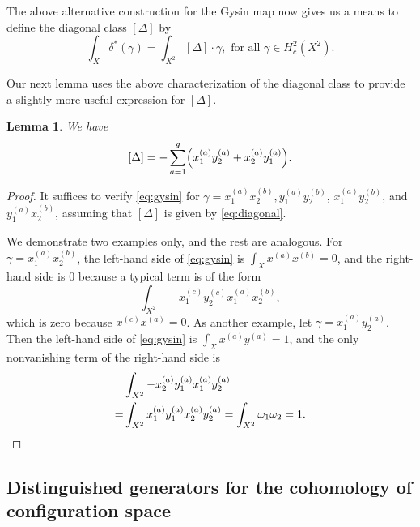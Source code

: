 \documentclass[11pt,reqno]{amsproc}
\numberwithin{equation}{section}
\newtheorem{lemma}[theorem]{Lemma}
\theoremstyle{definition}
\theoremstyle{remark}
\DeclarePairedDelimiter{\parens}{\lparen}{\rparen}
\newcommand{\spp}[1]{^{(#1)}}
\begin{document}
The above alternative construction for the Gysin map now gives us a means to define the diagonal class $[\Delta]$ by
\begin{equation}\label{eq:gysin}
\int_X \delta^*(\gamma) = \int_{X^2} [\Delta]\cdot \gamma, \text{ for all }\gamma\in H^2_c(X^2).
\end{equation}

Our next lemma uses the above characterization of the diagonal class to provide a slightly more useful expression for $[\Delta]$.


\begin{lemma}\label{lem:diagonal-class}
We have
\begin{equation}\label{eq:diagonal}
[\Delta]=-\sum_{a=1}^g \parens*{x\spp{a}_1 y\spp{a}_2+x\spp{a}_2 y\spp{a}_1}.
\end{equation}
\end{lemma}
\begin{proof} 



It suffices to verify \eqref{eq:gysin} for $\gamma=x\spp{a}_1 x\spp{b}_2, y\spp{a}_1 y\spp{b}_2$, $x\spp{a}_1 y\spp{b}_2$, and $y\spp{a}_1 x\spp{b}_2$, assuming that $[\Delta]$ is given by \eqref{eq:diagonal}.

We demonstrate two examples only, and the rest are analogous. For $\gamma=x\spp{a}_1 x\spp{b}_2$, the left-hand side of \eqref{eq:gysin} is $\int_X x\spp{a}x\spp{b}=0$, and the right-hand side is 0 because a typical term is of the form
\begin{equation}
\int_{X^2} -x\spp{c}_1 y\spp{c}_2 x\spp{a}_1 x\spp{b}_2,
\end{equation}
which is zero because $x\spp{c}x\spp{a}=0$. As another example, let $\gamma=x\spp{a}_1 y\spp{a}_2$. Then the left-hand side of \eqref{eq:gysin} is $\int_X x\spp{a}y\spp{a}=1$, and the only nonvanishing term of the right-hand side is
\begin{equation}
\begin{aligned}
&\int_{X^2} -x\spp{a}_2 y\spp{a}_1 x\spp{a}_1 y\spp{a}_2 \\
= & \int_{X^2} x\spp{a}_1 y\spp{a}_1 x\spp{a}_2 y\spp{a}_2 = \int_{X^2}\omega_1\omega_2=1. \qedhere
\end{aligned}
\end{equation}
\end{proof}

\subsection{Distinguished generators for the cohomology of configuration space}
\end{document}
